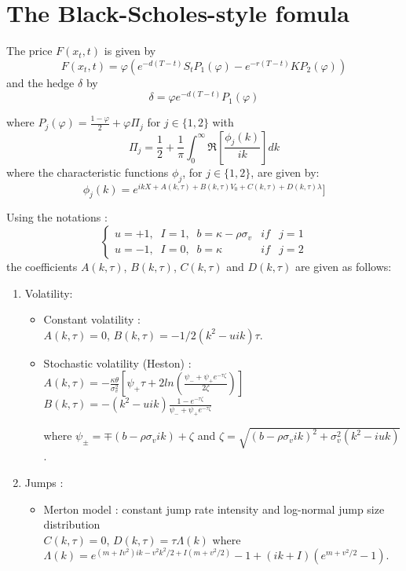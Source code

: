 \documentclass[12pt,a4paper]{article}
\def\dps{\displaystyle}
\begin{document}
\section{The Black-Scholes-style fomula}\label{SecBS}

The price $F(x_t,t)$ is given by
\[F(x_t,t) = \varphi\left(
e^{-d(T-t)}S_t P_1(\varphi) - e^{-r(T-t)}K
  P_2(\varphi)\right)\]  and the hedge $\delta$ by
  \[\delta = \varphi e^{-d(T-t)} P_1(\varphi) \]

  where
$P_j(\varphi) = \frac{1-\varphi}{2} + \varphi \Pi_j$ for $j
\in\{1,2\}$
  with \\
$$\Pi_j = \frac{1}{2} +  \frac{1}{\pi} \int_0^\infty \Re\left[ \frac{\phi_j(k)}{i
  k}\right] dk$$
where  the characteristic functions $\phi_j$, for $j\in \{1,2\}$,
are given by: \[\dps \phi_j(k) = e^{i k X + A(k,\tau) + B(k,\tau)
V_0 + C(k,\tau) + D(k,\tau)\lambda}]\]

 Using the notations : \[ \left\{
\begin{array}{lll}
u = +1,\;\;  I=1, \; \; b = \kappa - \rho \sigma_v &if& j=1 \\
u = -1,\;\;  I=0, \; \; b = \kappa &if& j=2
\end{array}
\right. \] the coefficients $A(k,\tau)$, $B(k,\tau)$,
$C(k,\tau)$ and  $D(k,\tau)$  are given as follows: \\


\begin{enumerate}
\item Volatility: \\
\begin{itemize}
\item Constant volatility : \\
$A(k,\tau)=0$, $B(k,\tau)=-1/2(k^2-uik)\tau $. \item Stochastic
volatility (Heston) :\\

$\dps A(k,\tau)=-\frac{\kappa\theta}{\sigma_v^2}\left[\psi_+ \tau
+ 2ln\left( \frac{\psi_-+\psi_+e^{-\tau\zeta}}{2\zeta}\right) \right] $ \\
$\dps
B(k,\tau)=-(k^2-uik)\frac{1-e^{-\tau\zeta}}{\psi_-+\psi_+e^{-\tau\zeta}}
$

where $\dps\psi_\pm = \mp (b-\rho\sigma_vik) + \zeta$ and
$\dps\zeta=\sqrt{(b-\rho\sigma_vik)^2 + \sigma_v^2(k^2-iuk)}$.
\end{itemize}
%
\item Jumps :\\
\begin{itemize}
\item Merton model : constant jump rate intensity and log-normal jump size distribution \\
$C(k,\tau)=0$, $D(k,\tau)=\tau\Lambda(k)$ where \\
$\dps\Lambda(k) = e^{(m+Iv^2) ik - v^2 k^2 /2 + I(m+v^2/2)} -1 +
 (ik+I)(e^{m+v^2/2}-1)$.
\end{itemize}
\end{enumerate}
%
\end{document}
